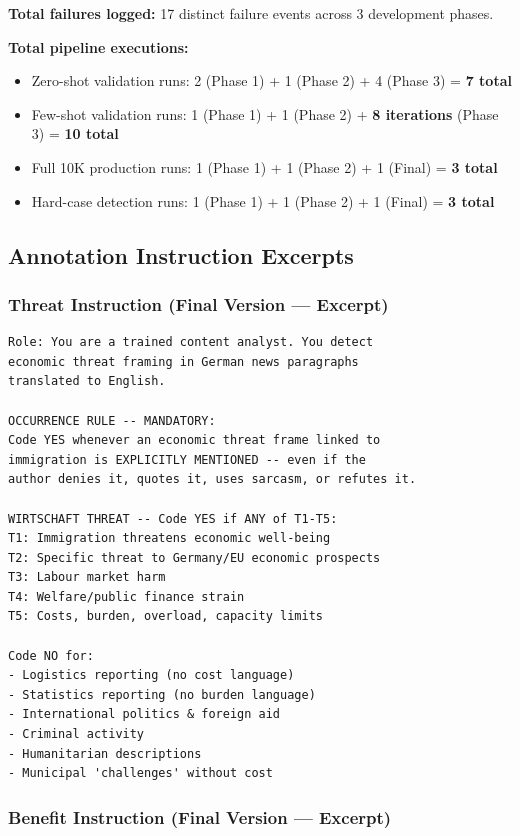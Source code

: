 \textbf{Total failures logged:} 17 distinct failure events across 3 development phases.

\textbf{Total pipeline executions:}
\begin{itemize}
    \item Zero-shot validation runs: 2 (Phase 1) + 1 (Phase 2) + 4 (Phase 3) = \textbf{7 total}
    \item Few-shot validation runs: 1 (Phase 1) + 1 (Phase 2) + \textbf{8 iterations} (Phase 3) = \textbf{10 total}
    \item Full 10K production runs: 1 (Phase 1) + 1 (Phase 2) + 1 (Final) = \textbf{3 total}
    \item Hard-case detection runs: 1 (Phase 1) + 1 (Phase 2) + 1 (Final) = \textbf{3 total}
\end{itemize}

\subsection{Annotation Instruction Excerpts}
\label{app:instructions}

\subsubsection*{Threat Instruction (Final Version --- Excerpt)}

\begin{lstlisting}[language={},caption={Threat Instruction --- Key Sections}]
Role: You are a trained content analyst. You detect 
economic threat framing in German news paragraphs 
translated to English.

OCCURRENCE RULE -- MANDATORY:
Code YES whenever an economic threat frame linked to 
immigration is EXPLICITLY MENTIONED -- even if the 
author denies it, quotes it, uses sarcasm, or refutes it.

WIRTSCHAFT THREAT -- Code YES if ANY of T1-T5:
T1: Immigration threatens economic well-being
T2: Specific threat to Germany/EU economic prospects
T3: Labour market harm
T4: Welfare/public finance strain
T5: Costs, burden, overload, capacity limits

Code NO for:
- Logistics reporting (no cost language)
- Statistics reporting (no burden language)
- International politics & foreign aid
- Criminal activity
- Humanitarian descriptions
- Municipal 'challenges' without cost
\end{lstlisting}

\subsubsection*{Benefit Instruction (Final Version --- Excerpt)}

